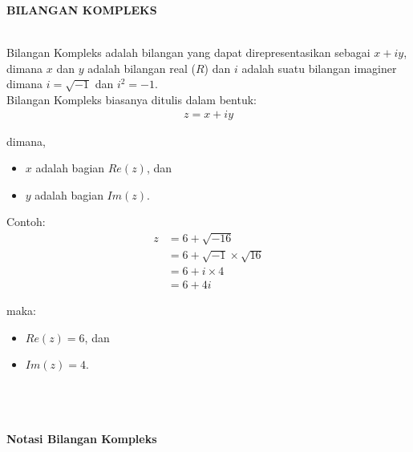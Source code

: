 \documentclass{article}
\begin{document}
\fontsize{14pt}{0}
\onehalfspacing

\begin{center}
    \textbf{BILANGAN KOMPLEKS}
\end{center}
\leavevmode\\

Bilangan Kompleks adalah bilangan yang dapat direpresentasikan sebagai \( x + iy \), dimana $x$ dan $y$ adalah bilangan real ($R$) dan $i$ adalah suatu bilangan imaginer dimana \( i = \sqrt{-1} \) dan \( i^2 = -1 \).\\

Bilangan Kompleks biasanya ditulis dalam bentuk:
\begin{align}
    \boxed{z = x + iy}\nonumber
\end{align}

\>dimana,
\begin{itemize}
    \item $x$ adalah bagian $Re(z)$, dan
    \item $y$ adalah bagian $Im(z)$. \\
\end{itemize}

Contoh:
\begin{align}
    z & = 6 + \sqrt{-16}
    \nonumber                            \\
      & = 6 + \sqrt{-1} \times \sqrt{16}
    \nonumber                            \\
      & = 6 + i \times 4
    \nonumber                            \\
      & = 6 + 4i
    \nonumber
\end{align}

maka:
\begin{itemize}
    \item $Re(z) = 6$, dan
    \item $Im(z) = 4$. \\ \\ \\ \\
\end{itemize}



\newpage
\begin{center}
    \textbf{Notasi Bilangan Kompleks}
\end{center}
\leavevmode\\

\\ \\
\end{document}
